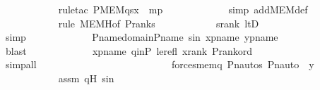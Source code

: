 \begin{isabellebody}
\ \ \ \ \ \ \ \ \ \ \isamarkupfalse%
\ {\isacharparenleft}{\kern0pt}rule{\isacharunderscore}{\kern0pt}tac\ P{\isacharequal}{\kern0pt}{\isachardoublequoteopen}MEM{\isacharparenleft}{\kern0pt}q{\isacharcomma}{\kern0pt}s{\isacharcomma}{\kern0pt}x{\isacharparenright}{\kern0pt}{\isachardoublequoteclose}\ \ mp{\isacharparenright}{\kern0pt}\ \isanewline
\ \ \ \ \ \ \ \ \ \ \isamarkupfalse%
\ {\isacharparenleft}{\kern0pt}simp\ add{\isacharcolon}{\kern0pt}MEM{\isacharunderscore}{\kern0pt}def{\isacharparenright}{\kern0pt}\ \isanewline
\ \ \ \ \ \ \ \ \ \ \isamarkupfalse%
\ {\isacharparenleft}{\kern0pt}rule\ MEMH{\isacharbrackleft}{\kern0pt}of\ {\isachardoublequoteopen}P{\isacharunderscore}{\kern0pt}rank{\isacharparenleft}{\kern0pt}s{\isacharparenright}{\kern0pt}{\isachardoublequoteclose}{\isacharbrackright}{\kern0pt}{\isacharparenright}{\kern0pt}\isanewline
\ \ \ \ \ \ \ \ \ \ \isamarkupfalse%
\ srank\ ltD\ \isanewline
\ \ \ \ \ \ \ \ \ \ \ \ \ \ \ \isamarkupfalse%
\ simp\ \isanewline
\ \ \ \ \ \ \ \ \ \ \isamarkupfalse%
\ P{\isacharunderscore}{\kern0pt}name{\isacharunderscore}{\kern0pt}domain{\isacharunderscore}{\kern0pt}P{\isacharunderscore}{\kern0pt}name{\isacharprime}{\kern0pt}\ sin\ xpname\ ypname\ \isanewline
\ \ \ \ \ \ \ \ \ \ \ \ \ \ \isamarkupfalse%
\ blast\ \isanewline
\ \ \ \ \ \ \ \ \ \ \isamarkupfalse%
\ xpname\ qinP\ le{\isacharunderscore}{\kern0pt}refl\ xrank\ P{\isacharunderscore}{\kern0pt}rank{\isacharunderscore}{\kern0pt}ord\ \isanewline
\ \ \ \ \ \ \ \ \ \ \ \ \ \isamarkupfalse%
\ simp{\isacharunderscore}{\kern0pt}all\ \isanewline
\ \ \ \ \ \ \ \ \ \ \isamarkupfalse%
\ \isanewline
\ \ \ \ \ \ \ \ \isamarkupfalse%
\ \isamarkupfalse%
\ {\isachardoublequoteopen}{\isachardot}{\kern0pt}{\isachardot}{\kern0pt}{\isachardot}{\kern0pt}\ {\isasymlongleftrightarrow}\ forces{\isacharunderscore}{\kern0pt}mem{\isacharparenleft}{\kern0pt}{\isasympi}{\isacharbackquote}{\kern0pt}q{\isacharcomma}{\kern0pt}\ Pn{\isacharunderscore}{\kern0pt}auto{\isacharparenleft}{\kern0pt}{\isasympi}{\isacharparenright}{\kern0pt}{\isacharbackquote}{\kern0pt}s{\isacharcomma}{\kern0pt}\ Pn{\isacharunderscore}{\kern0pt}auto{\isacharparenleft}{\kern0pt}{\isasympi}{\isacharparenright}{\kern0pt}\ {\isacharbackquote}{\kern0pt}\ y{\isacharparenright}{\kern0pt}{\isachardoublequoteclose}\ \isanewline
\ \ \ \ \ \ \ \ \ \ \isamarkupfalse%
\ assm\ q{\isacharprime}{\kern0pt}H\ s{\isacharprime}{\kern0pt}in\ \isamarkupfalse%

\end{isabellebody}
